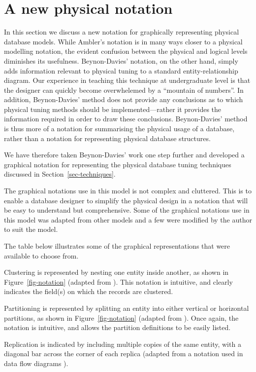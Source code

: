 \documentclass{llncs}
\begin{document}
\section{A new physical notation}
\label{sec-notation}

In this section we discuss a new notation for graphically representing
physical database models. While Ambler's notation is in many ways closer
to a physical modelling notation, the evident confusion between the
physical and logical levels diminishes its usefulness. Beynon-Davies'
notation, on the other hand, simply adds information relevant to
physical tuning to a standard entity-relationship diagram. Our
experience in teaching this technique at undergraduate level is that the
designer can quickly become overwhelemed by a ``mountain of numbers''.
In addition, Beynon-Davies' method does not provide any conclusions as
to which physical tuning methods should be implemented---rather it
provides the information required in order to draw these conclusions.
Beynon-Davies' method is thus more of a notation for summarising the
physical usage of a database, rather than a notation for representing
physical database structures.

We have therefore taken Beynon-Davies' work one step further and
developed a graphical notation for representing the physical database
tuning techniques discussed in Section~\ref{sec-techniques}.

The graphical notations use in this model is not complex and cluttered.
This is to enable a database designer to simplify the physical design in
a notation that will be easy to understand but comprehensive. Some of
the graphical notations use in this model was adapted from other models
and a few were modified by the author to suit the model.

The table below illustrates some of the graphical representations that
were available to choose from.

Clustering is represented by nesting one entity inside another, as shown
in Figure~\ref{fig-notation} (adapted from \cite{BeDa-P-1992-PDD}). This
notation is intuitive, and clearly indicates the field(s) on which the
records are clustered.

Partitioning is represented by splitting an entity into either vertical
or horizontal partitions, as shown in Figure~\ref{fig-notation} (adapted
from \cite{Silb-A-2002-4E}). Once again, the notation is intuitive, and
allows the partition definitions to be easily listed.

Replication is indicated by including multiple copies of the same
entity, with a diagonal bar across the corner of each replica (adapted
from a notation used in data flow diagrams \cite{Gane-C-1979}).
\end{document}
